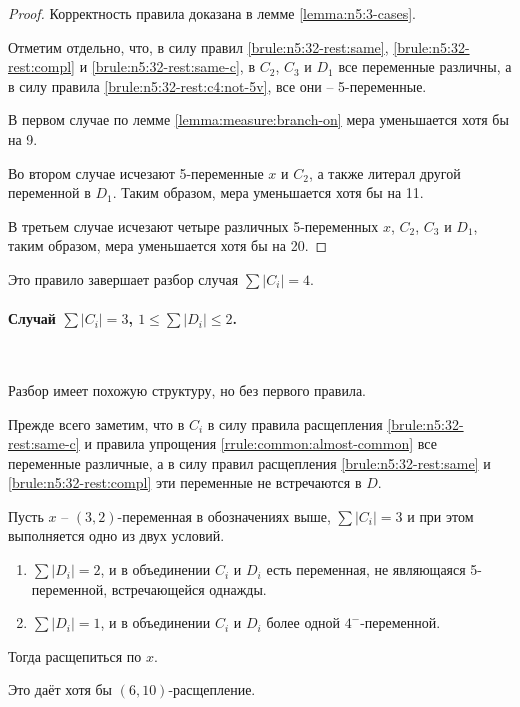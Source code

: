 \begin{proof}
 Корректность правила доказана в лемме \ref{lemma:n5:3-cases}.

 Отметим отдельно, что, в силу правил \ref{brule:n5:32-rest:same}, \ref{brule:n5:32-rest:compl} и \ref{brule:n5:32-rest:same-c}, в $C_2$, $C_3$ и $D_1$ все переменные различны, а в силу правила \ref{brule:n5:32-rest:c4:not-5v}, все они -- 5-переменные.

 В первом случае по лемме \ref{lemma:measure:branch-on} мера уменьшается хотя бы на 9.

 Во втором случае исчезают 5-переменные $x$ и $C_2$, а также литерал другой переменной в $D_1$. Таким образом, мера уменьшается хотя бы на 11.

 В третьем случае исчезают четыре различных 5-переменных $x$, $C_2$, $C_3$ и $D_1$, таким образом, мера уменьшается хотя бы на 20.
\end{proof}

Это правило завершает разбор случая $\sum |C_i| = 4$.

\paragraph{Случай $\sum |C_i| = 3$, $1 \leq \sum |D_i| \leq 2$.} ~

Разбор имеет похожую структуру, но без первого правила.

Прежде всего заметим, что в $C_i$ в силу правила расщепления \ref{brule:n5:32-rest:same-c} и правила упрощения \ref{rrule:common:almost-common} все переменные различные, а в силу правил расщепления \ref{brule:n5:32-rest:same} и \ref{brule:n5:32-rest:compl} эти переменные не встречаются в $D$.

\begin{brule}
 Пусть $x$ -- $(3,2)$-переменная в обозначениях выше, $\sum |C_i| = 3$ и при этом выполняется одно из двух условий.

 \begin{enumerate}
  \item $\sum |D_i| = 2$, и в объединении $C_i$ и $D_i$ есть переменная, не являющаяся 5-переменной, встречающейся однажды.
  \item $\sum |D_i| = 1$, и в объединении $C_i$ и $D_i$ более одной $4^-$-переменной.
 \end{enumerate}

 Тогда расщепиться по $x$.

 Это даёт хотя бы $(6,10)$-расщепление.
 \label{brule:n5:32-rest:c3:not-5v}
\end{brule}

